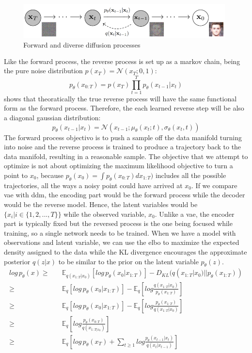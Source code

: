 \documentclass[../main.tex]{subfiles}
\begin{document}
\begin{figure}[H]
	\centering
	\includegraphics[width=11cm]{imgs/relatedwork/forward-reverse-diffusion}
	\caption{Forward and diverse diffusion processes}
	\label{fig:related-forward-reverse-diffusion}
\end{figure}
Like the forward process, the reverse process is set up as a markov chain, being the pure noise distribution $p(x_T) = \mathcal{N}(x_T; 0, 1)$:
\[p_{\theta}(x_{0:T}) = p(x_T) \prod_{t=1}^{T} p_{\theta}(x_{t-1}| x_t)\]
\cite{feller1950} shows that theoratically the true reverse process will have the same functional form as the forward process. Therefore, the each learned reverse step will be also a diagonal gaussian distribution:
\[p_{\theta}(x_{t-1}|x_t) = \mathcal{N}(x_{t-1}; \mu_{\theta}(x_t; t), \sigma_{\theta}(x_t, t))\]
The forward process objectivo is to push a sample off the data manifold turning into noise and the reverse process is trained to produce a trajectory back to the data manifold, resulting in a reasonable sample. The objective that we attempt to optimize is not about optimizing the maximum likelihood objective to turn a point to $x_0$, because $p_{\theta}(x_0) = \int p_{\theta}(x_{0:T}) dx_{1:T})$ includes all the possible trajectories, all the ways a noisy point could have arrived at $x_0$. If we compare \gls{vae} with \gls{ddm}, the encoding part would be the forward process while the decoder would be the reverse model. Hence, the latent variables would be $\{x_i | i \in \{1, 2, ..., T\}\}$ while the observed variable, $x_0$. Unlike a \gls{vae}, the encoder part is typically fixed but the reversed process is the one being focused while training, so a single network needs to be trained. When we have a model with observations and latent variable, we can use the \gls{elbo} to maximize the expected density assigned to the data while the KL divergence encourages the approximate posterior $q(z|x)$ to be similar to the prior on the latent variable $p_{\theta}(z)$.
\begin{align*}
	log \, p_{\theta}(x) \ge& \quad \mathds{E}_{q(x_{1:T}|x_0)}[log \, p_{\theta}(x_0| x_{1:T})] - D_{KL}(q(x_{1:T}| x_0) || p_{\theta}(x_{1:T}))\\
	\ge& \quad \mathds{E}_{q}[log \, p_{\theta}(x_0| x_{1:T})] - \mathds{E}_q[log \frac{q(x_{1:T}| x_0)}{p_{\theta}(x_{1:T})}]\\
	\ge& \quad \mathds{E}_{q}[log \, p_{\theta}(x_0| x_{1:T})] -  \mathds{E}_q[log\frac{p_{\theta}(x_{1:T})}{q(x_{1:T}|x_0)}]\\
	\ge& \quad \mathds{E}_q[log \frac{p_{\theta}(x_{0:T})}{q(x_{1:T|x_0})}]\\
	\ge& \quad \mathds{E}_q[log \, p_{\theta}(x_T) + \sum_{t\ge1}log \frac{p_{\theta}(x_{t-1}|x_t)}{q(x_t| x_{t-1})}]
\end{align*}
\end{document}
